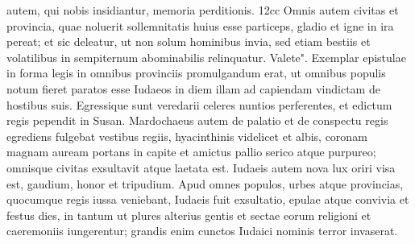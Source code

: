 \begin{biblechapter}
autem, qui nobis insidiantur, memoria perditionis. 12cc Omnis autem civitas et provincia, quae noluerit sollemnitatis huius esse particeps, gladio et igne in ira pereat; et sic deleatur, ut non solum hominibus invia, sed etiam bestiis et volatilibus in sempiternum abominabilis relinquatur. Valete". 
\verse Exemplar epistulae in forma legis in omnibus provinciis promulgandum erat, ut omnibus populis notum fieret paratos esse Iudaeos in diem illam ad capiendam vindictam de hostibus suis. 
\verse Egressique sunt veredarii celeres nuntios perferentes, et edictum regis pependit in Susan. 
\verse Mardochaeus autem de palatio et de conspectu regis egrediens fulgebat vestibus regiis, hyacinthinis videlicet et albis, coronam magnam auream portans in capite et amictus pallio serico atque purpureo; omnisque civitas exsultavit atque laetata est. 
\verse Iudaeis autem nova lux oriri visa est, gaudium, honor et tripudium. 
\verse Apud omnes populos, urbes atque provincias, quocumque regis iussa veniebant, Iudaeis fuit exsultatio, epulae atque convivia et festus dies, in tantum ut plures alterius gentis et sectae eorum religioni et caeremoniis iungerentur; grandis enim cunctos Iudaici nominis terror invaserat. 
\end{biblechapter}

